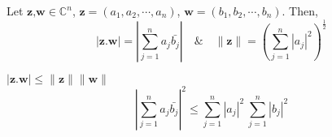 	\begin{definition}
		Let $\textbf{z,w} \in \mathbb{C}^n$, $ \textbf{z} = (a_1, a_2, \cdots, a_n)$, $\textbf{w} = (b_1, b_2, \cdots, b_n)$. Then,
		$$|\textbf{z}.\textbf{w}| = \left|\sum_{j=1}^n a_j \bar{b_j}\right| \quad \& \quad \|\textbf{z}\| = \left(\sum_{j=1}^n |a_j|^2\right)^\frac{1}{2}$$
	\end{definition}
	\begin{theorem}
		$|\textbf{z}.\textbf{w}| \le \|\textbf{z}\| \|\textbf{w}\|$\\
		$$\left|\sum_{j=1}^n a_j\bar{b_j}\right|^2 \le \sum_{j=1}^n |a_j|^2\ \sum_{j=1}^n |b_j|^2$$
	\end{theorem}
